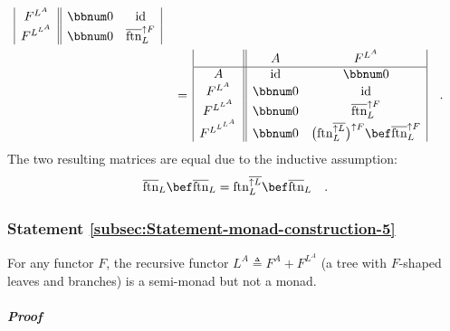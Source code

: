 \begin{align*}
\begin{array}{|c||cc|}
F^{L^{A}} & \bbnum 0 & \text{id}\\
F^{L^{L^{A}}} & \bbnum 0 & \overline{\text{ftn}}_{L}^{\uparrow F}
\end{array}\\
 & \quad=\,\begin{array}{|c||cc|}
 & A & F^{L^{A}}\\
\hline A & \text{id} & \bbnum 0\\
F^{L^{A}} & \bbnum 0 & \text{id}\\
F^{L^{L^{A}}} & \bbnum 0 & \overline{\text{ftn}}_{L}^{\uparrow F}\\
F^{L^{L^{L^{A}}}} & \bbnum 0 & \big(\text{ftn}_{L}^{\overline{\uparrow L}}\big)^{\uparrow F}\bef\overline{\text{ftn}}_{L}^{\uparrow F}
\end{array}\quad.
\end{align*}
The two resulting matrices are equal due to the inductive assumption:
\[
\overline{\text{ftn}}_{L}\bef\overline{\text{ftn}}_{L}=\text{ftn}_{L}^{\overline{\uparrow L}}\bef\overline{\text{ftn}}_{L}\quad.
\]


\subsubsection{Statement \label{subsec:Statement-monad-construction-5}\ref{subsec:Statement-monad-construction-5}}

For any functor $F$, the recursive functor $L^{A}\triangleq F^{A}+F^{L^{A}}$
(a tree with $F$-shaped leaves and branches) is a semi-monad but
not a monad.

\subparagraph{Proof}

